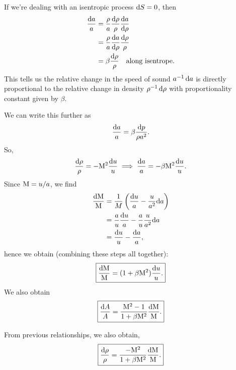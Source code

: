 \begin{node}
If we're dealing with an isentropic process $\mathrm{d} S=0$,
then
\begin{subequations}
  \begin{align}
\frac{\mathrm{d} a}{a} &= \frac{\rho}{a}\frac{\mathrm{d}\rho}{\rho}\frac{\mathrm{d} a}{\mathrm{d}\rho}\\
&= \frac{\rho}{a}\frac{\mathrm{d} a}{\mathrm{d}\rho}\frac{\mathrm{d}\rho}{\rho}\\
&=\beta\frac{\mathrm{d}\rho}{\rho}\quad\mbox{along isentrope}.
  \end{align}
\end{subequations}
This tells us the relative change in the speed of sound $a^{-1}\,\mathrm{d} a$
is directly proportional to the relative change in density $\rho^{-1}\,\mathrm{d}\rho$
with proportionality constant given by $\beta$.


We can write this further as
\begin{equation}
\frac{\mathrm{d} a}{a} = \beta\frac{\mathrm{d} p}{\rho a^{2}}.
\end{equation}
So, 
\begin{equation}
\frac{\mathrm{d}\rho}{\rho}=-\mathrm{M}^{2}\frac{\mathrm{d} u}{u}\implies\frac{\mathrm{d} a}{a}=-\beta\mathrm{M}^{2}\frac{\mathrm{d} u}{u}.
\end{equation}
Since $\mathrm{M}=u/a$, we find
\begin{subequations}
  \begin{align}
\frac{\mathrm{d}\mathrm{M}}{\mathrm{M}} &= \frac{1}{M}\left(\frac{\mathrm{d} u}{a}-\frac{u}{a^{2}}\mathrm{d} a\right)\\
&= \frac{a}{u}\frac{\mathrm{d} u}{a}-\frac{a}{u}\frac{u}{a^{2}}\mathrm{d} a\\
&=\frac{\mathrm{d} u}{u}-\frac{\mathrm{d} a}{a},
  \end{align}
\end{subequations}
hence we obtain (combining these steps all together):
\begin{equation}\label{eq:fall2026:me101a:lec19:change-in-u-related-to-mach-number}
\boxed{\frac{\mathrm{d}\mathrm{M}}{\mathrm{M}} = (1+\beta\mathrm{M}^{2})\frac{\mathrm{d} u}{u}.}
\end{equation}
We also obtain
\begin{equation}
\boxed{\frac{\mathrm{d} A}{A}=\frac{\mathrm{M}^{2}-1}{1+\beta\mathrm{M}^{2}}\frac{\mathrm{d}\mathrm{M}}{\mathrm{M}}.}
\end{equation}
\end{node}

\begin{node}
From previous relationships, we also obtain,
\begin{equation}
\boxed{\frac{\mathrm{d}\rho}{\rho}=\frac{-\mathrm{M}^{2}}{1+\beta\mathrm{M}^{2}}\frac{\mathrm{d}\mathrm{M}}{\mathrm{M}}.}
\end{equation}
\end{node}

